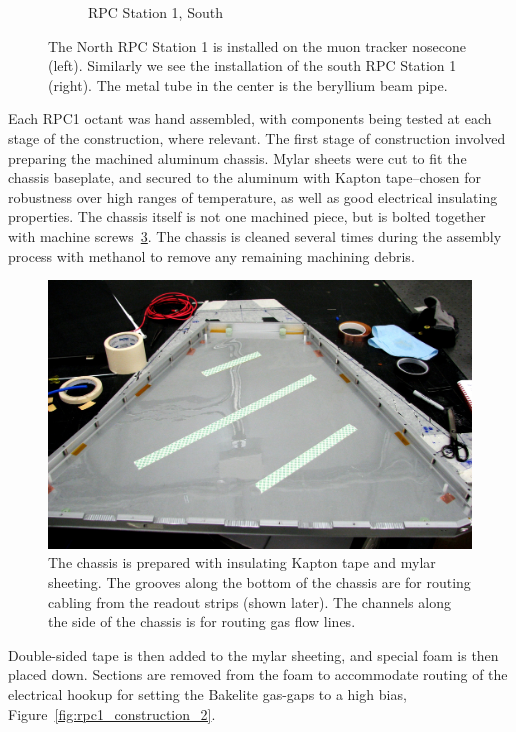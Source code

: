 \begin{figure}
\begin{subfigure}[b]{0.5\textwidth}
    \caption{RPC Station 1, South}
    \label{fig:rpc1s}
  \end{subfigure}
  \caption{
    The North RPC Station 1 is installed on the muon tracker nosecone (left).
    Similarly we see the installation of the south RPC Station 1 (right). The
    metal tube in the center is the beryllium beam pipe.
  }
  \label{fig:rpc1_installed}
\end{figure}

Each RPC1 octant was hand assembled, with components being tested at each stage
of the construction, where relevant. The first stage of construction involved
preparing the machined aluminum chassis. Mylar sheets were cut to fit the
chassis baseplate, and secured to the aluminum with Kapton tape--chosen for
robustness over high ranges of temperature, as well as good electrical
insulating properties. The chassis itself is not one machined piece, but is
bolted together with machine screws~\ref{fig:rpc1_construction_1}. The chassis
is cleaned several times during the assembly process with methanol to remove any
remaining machining debris.

\begin{figure}
  \centering
  \includegraphics[width=0.7\linewidth]{./figures/rpc1_construction_1}
  \caption{
    The chassis is prepared with insulating Kapton tape and mylar sheeting. The
    grooves along the bottom of the chassis are for routing cabling from the
    readout strips (shown later). The channels along the side of the chassis is
    for routing gas flow lines.
  }
  \label{fig:rpc1_construction_1}
\end{figure}

Double-sided tape is then added to the mylar sheeting, and special foam is then
placed down. Sections are removed from the foam to accommodate routing of the
electrical hookup for setting the Bakelite gas-gaps to a high bias,
Figure~\ref{fig:rpc1_construction_2}.

